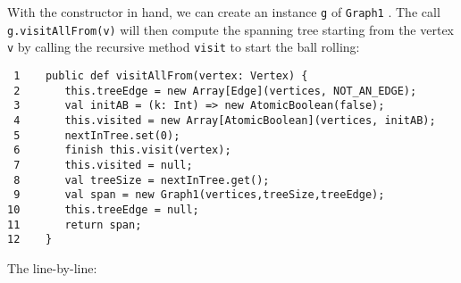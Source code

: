 With the constructor in hand, we can create an instance {\tt g}  of {\tt Graph1} .
The call {\tt g.visitAllFrom(v)} will then compute the
spanning tree starting from the vertex {\tt v} by calling the 
recursive method {\tt visit} to start the ball rolling:
\begin{verbatim}
 1    public def visitAllFrom(vertex: Vertex) {
 2       this.treeEdge = new Array[Edge](vertices, NOT_AN_EDGE);
 3       val initAB = (k: Int) => new AtomicBoolean(false);
 4       this.visited = new Array[AtomicBoolean](vertices, initAB);
 5       nextInTree.set(0);
 6       finish this.visit(vertex);
 7       this.visited = null;
 8       val treeSize = nextInTree.get();
 9       val span = new Graph1(vertices,treeSize,treeEdge);
10       this.treeEdge = null;
11       return span;
12    }
\end{verbatim}   
The line-by-line:
